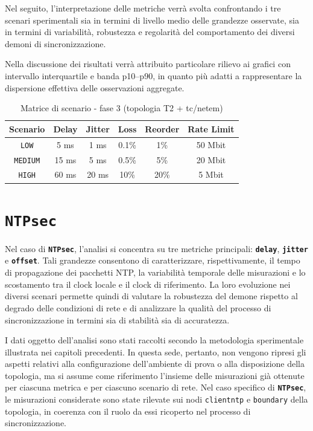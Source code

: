 Nel seguito, l’interpretazione delle metriche verrà svolta confrontando i tre scenari
sperimentali sia in termini di livello medio delle grandezze osservate, sia in
termini di variabilità, robustezza e regolarità del comportamento dei diversi demoni
di sincronizzazione.

Nella discussione dei risultati verrà attribuito particolare rilievo ai grafici con
intervallo interquartile e banda p10--p90, in quanto più adatti a rappresentare la
dispersione effettiva delle osservazioni aggregate.

\begin{table}[H]
  \centering
  \caption{Matrice di scenario - fase 3 (topologia T2 + tc/netem)}
  \begin{tabular}{|c|c|c|c|c|c|}
    \hline
    \textbf{Scenario} & \textbf{Delay} & \textbf{Jitter} & \textbf{Loss} & \textbf{Reorder} & \textbf{Rate Limit} \\
    \hline
    \texttt{LOW}      & 5 ms           & 1 ms            & 0.1\%         & 1\%              & 50 Mbit             \\
    \hline
    \texttt{MEDIUM}   & 15 ms          & 5 ms            & 0.5\%         & 5\%              & 20 Mbit             \\
    \hline
    \texttt{HIGH}     & 60 ms          & 20 ms           & 10\%          & 20\%             & 5 Mbit              \\
    \hline
  \end{tabular}
  \label{tab:scenario_matrix}
\end{table}
\section{\texttt{NTPsec}}

Nel caso di \texttt{\textbf{NTPsec}}, l’analisi si concentra su tre metriche
principali: \texttt{\textbf{delay}}, \texttt{\textbf{jitter}} e \texttt{\textbf{offset}}.
Tali grandezze consentono di caratterizzare, rispettivamente, il tempo di
propagazione dei pacchetti NTP, la variabilità temporale delle misurazioni e lo scostamento
tra il clock locale e il clock di riferimento. La loro evoluzione nei diversi
scenari permette quindi di valutare la robustezza del demone rispetto al degrado
delle condizioni di rete e di analizzare la qualità del processo di
sincronizzazione in termini sia di stabilità sia di accuratezza.

I dati oggetto dell’analisi sono stati raccolti secondo la metodologia
sperimentale illustrata nei capitoli precedenti. In questa sede, pertanto, non vengono
ripresi gli aspetti relativi alla configurazione dell’ambiente di prova o alla disposizione
della topologia, ma si assume come riferimento l’insieme delle misurazioni già
ottenute per ciascuna metrica e per ciascuno scenario di rete. Nel caso specifico
di \texttt{\textbf{NTPsec}}, le misurazioni considerate sono state rilevate sui nodi
\texttt{clientntp} e \texttt{boundary} della topologia, in coerenza con il ruolo
da essi ricoperto nel processo di sincronizzazione.


